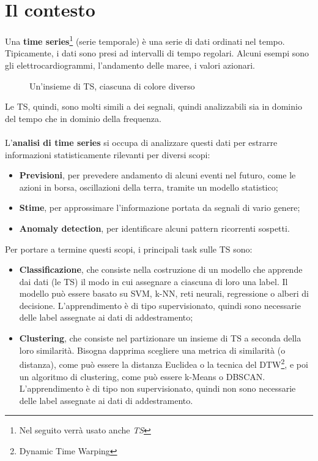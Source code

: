 \section{Il contesto}
Una \textbf{time series}\footnote{Nel seguito verrà usato anche \textit{TS}} (serie temporale) è una serie di dati ordinati nel tempo. Tipicamente, i dati sono presi ad intervalli di tempo regolari. Alcuni esempi sono gli elettrocardiogrammi, l'andamento delle maree, i valori azionari.
\begin{figure}[H]
	\centering
	\caption{Un'insieme di TS, ciascuna di colore diverso}
	\label{fig:timeseries}
\end{figure}
Le TS, quindi, sono molti simili a dei segnali, quindi analizzabili sia in dominio del tempo che in dominio della frequenza.\\
\\
L'\textbf{analisi di time series} si occupa di analizzare questi dati per estrarre informazioni statisticamente rilevanti per diversi scopi:
\begin{itemize}
	\item \textbf{Previsioni}, per prevedere andamento di alcuni eventi nel futuro, come le azioni in borsa, oscillazioni della terra, tramite un modello statistico;
	\item \textbf{Stime}, per approssimare l'informazione portata da segnali di vario genere;
	\item \textbf{Anomaly detection}, per identificare alcuni pattern ricorrenti sospetti.
\end{itemize}
Per portare a termine questi scopi, i principali task sulle TS sono:
\begin{itemize}
	\item \textbf{Classificazione}, che consiste nella costruzione di un modello che apprende dai dati (le TS) il modo in cui assegnare a ciascuna di loro una label. Il modello può essere basato su SVM, k-NN, reti neurali, regressione o alberi di decisione. L'apprendimento è di tipo supervisionato, quindi sono necessarie delle label assegnate ai dati di addestramento;
	\item \textbf{Clustering}, che consiste nel partizionare un insieme di TS a seconda della loro similarità. Bisogna dapprima scegliere una metrica di similarità (o distanza), come può essere la distanza Euclidea o la tecnica del DTW\footnote{Dynamic Time Warping}, e poi un algoritmo di clustering, come può essere k-Means o DBSCAN. L'apprendimento è di tipo non supervisionato, quindi non sono necessarie delle label assegnate ai dati di addestramento.
\end{itemize}
